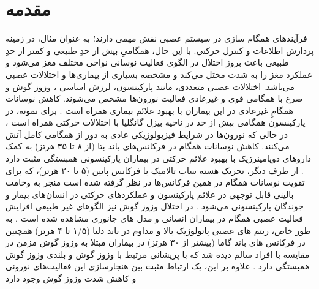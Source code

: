 \section{مقدمه}

فرآیندهای همگام سازی در سیستم عصبی نقش مهمی دارند؛ به عنوان مثال، در زمینه پردازش اطلاعات و کنترل حرکتی. 
با این حال، همگامیِ بیش از حدِ طبیعی و کمتر از حدِ طبیعی باعث بروز اختلال در الگوی فعالیت نوسانی نواحی مختلف مغز می‌شود و عملکرد مغز را به شدت مختل می‌کند و مشخصه بسیاری از بیماری‌ها و اختلالات عصبی می‌باشد.
اختلالات عصبی متعددی، مانند پارکینسون، لرزش اساسی
 ، وزوز گوش
و صرع با همگامی قوی و غیرعادی فعالیت نورون‌ها مشخص می‌شوند. کاهش نوسانات همگامِ غیرعادی در این بیماران با بهبود علائم بیماری همراه است 
\cite{uhlhaas2006neural}.
برای نمونه، در پارکینسون همگامی بیش از حد در ناحیه بیزل گانگلیا
  با اختلالات حرکتی همراه است
 \cite{hammond2007pathological}
 ، در حالی که نورون‌ها در شرایط فیزیولوژیکی عادی به دور از همگامی کامل آتش می‌کنند.  کاهش نوسانات همگام در فرکانس‌های باند بتا (از ۸ تا ۳۵ هرتز) به کمک داروهای دوپامینرژیک با بهبود علائم حرکتی در بیماران پارکینسونی همبستگی مثبت دارد
  \cite{hammond2007pathological, kuhn2006reduction}.
  از طرف دیگر، تحریک هسته ساب تالامیک
با فرکانس پایین (۵ تا ۲۰ هرتز)، که برای تقویت نوسانات همگام در همین فرکانس‌ها در نظر گرفته شده است منجر به وخامت بالینی قابل توجهی در علائم پارکینسون و عملکردهای حرکتی در انسان‌های بیمار و جوندگان پارکینسونی می‌شود
\cite{jenkinson2011new, moro2002impact, timmermann2004ten, eusebio2008effects, barnikol2008tremor, chen2011stimulation}.
در اختلال وزوز گوش نیز الگوهای غیر طبیعی افزایش فعالیت عصبی همگام در بیماران انسانی و مدل های جانوری مشاهده شده است
\cite{weisz2005tinnitus, weisz2007neural, dohrmann2007tuning, adamchic2014reversing}.
 به طور خاص، ریتم های عصبی پاتولوژیک بالا و مداوم در باند دلتا (۱/۵ تا ۴ هرتز) همچنین در فرکانس های باند گاما (بیشتر از ۳۰ هرتز) در بیماران مبتلا به وزوز گوش مزمن در مقایسه با افراد سالم دیده شد که با پریشانی مرتبط با وزوز گوش و بلندی وزوز گوش همبستگی دارد
 \cite{weisz2005tinnitus, weisz2007neural, lorenz2009loss}.
  علاوه بر این، یک ارتباط مثبت بین هنجارسازی این فعالیت‌های نورونی و کاهش شدت وزوز گوش وجود دارد

